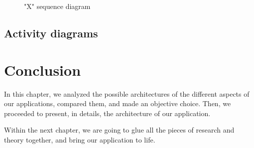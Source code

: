 \begin{figure}[H]
	\centerfloat
	\sffamily
	\begin{tikzpicture}[scale=1, every node/.append style={transform shape}]
		

	\end{tikzpicture}

	\caption{"X" sequence diagram}
	\label{fig:x-seq-diag}
\end{figure}

\subsection{Activity diagrams}
\section{Conclusion}

In this chapter, we analyzed the possible architectures of the different aspects of our applications, compared them, and made an objective choice.
Then, we proceeded to present, in details, the architecture of our application.

Within the next chapter, we are going to glue all the pieces of research and theory together, and bring our application to life.